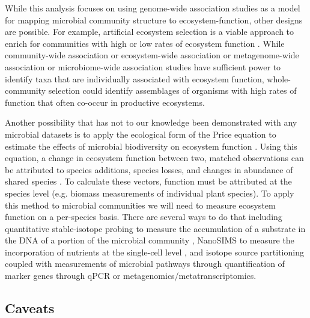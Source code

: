 \documentclass{article}
\begin{document}
While this analysis focuses on using genome-wide association studies as a model
for mapping microbial community structure to ecosystem-function, other designs
are possible. For example, artificial ecosystem selection is a viable approach
to enrich for communities with high or low rates of ecosystem function
\citep{swenson2000, panke-buisse2015}. While community-wide association or
ecosystem-wide association or metagenome-wide association or microbiome-wide
association studies have sufficient power to identify taxa that are individually
associated with ecosystem function, whole-community selection could identify
assemblages of organisms with high rates of function that often co-occur in
productive ecosystems.

Another possibility that has not to our knowledge been demonstrated with any
microbial datasets is to apply the ecological form of the Price equation to
estimate the effects of microbial biodiversity on ecosystem function
\citep{fox2006, bannar-martin2018}. Using this equation, a change in ecosystem function between two, matched
observations can be attributed to species additions, species losses, and
changes in abundance of shared species \citep{fox2006,
bannar-martin2018}. To
calculate these vectors, function must be attributed at the species level (e.g.
biomass measurements of individual plant species). To apply this method to
microbial communities we will need to measure ecosystem function on a
per-species basis. There are several ways to do that including quantitative stable-isotope
probing to measure the accumulation of a substrate in the DNA of a portion of
the microbial community \citep{hungate2015}, NanoSIMS to measure the incorporation of nutrients at
the single-cell level \citep{mayali2012}, and isotope source partitioning coupled with measurements
of microbial pathways through quantification of marker genes through qPCR or
metagenomics/metatranscriptomics.

\subsection{Caveats}
\end{document}
